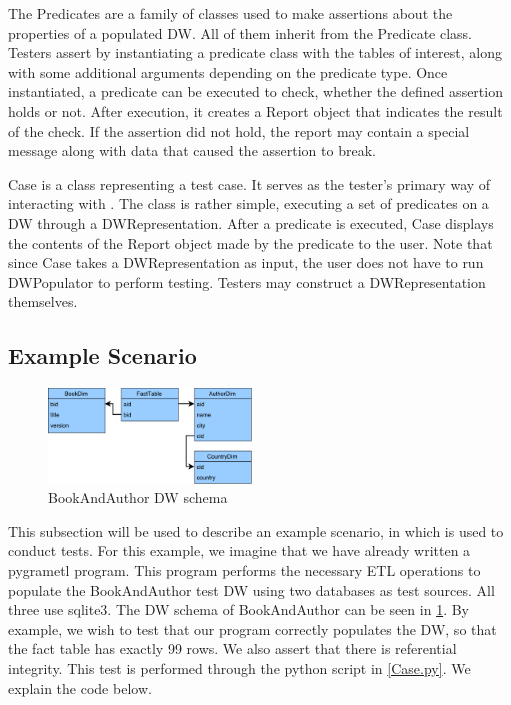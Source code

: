 The Predicates are a family of classes used to make assertions about the properties of a populated DW. All of them inherit from the Predicate class. Testers assert by instantiating a predicate class with the tables of interest, along with some additional arguments depending on the predicate type. Once instantiated, a predicate can be executed to check, whether the defined assertion holds or not. After execution, it creates a Report object that indicates the result of the check. If the assertion did not hold, the report may contain a special message along with data that caused the assertion to break.

Case is a class representing a test case. It serves as the tester’s primary way of interacting with \FW{}. The class is rather simple, executing a set of predicates on a DW through a DWRepresentation. After a predicate is executed, Case displays the contents of the Report object made by the predicate to the user.  Note that since Case takes a DWRepresentation as input, the user does not have to run DWPopulator to perform testing. Testers may construct a DWRepresentation themselves. 

\subsection{Example Scenario}

\begin{figure}
\centering
\includegraphics[width=0.48\textwidth]{figures/example_dw.pdf}
\caption{BookAndAuthor DW schema}
\label{fig:exdw}
\end{figure}

This subsection will be used to describe an example scenario, in which \FW{} is used to conduct tests. For this example, we imagine that we have already written a pygrametl program. This program performs the necessary ETL operations to populate the BookAndAuthor test DW using two databases as test sources. All three use sqlite3. The DW schema of BookAndAuthor can be seen in \cref{fig:exdw}. By example, we wish to test that our program correctly populates the DW, so that the fact table has exactly 99 rows. We also assert that there is referential integrity. This test is performed through the python script in \cref{Case.py}. We explain the code below.

